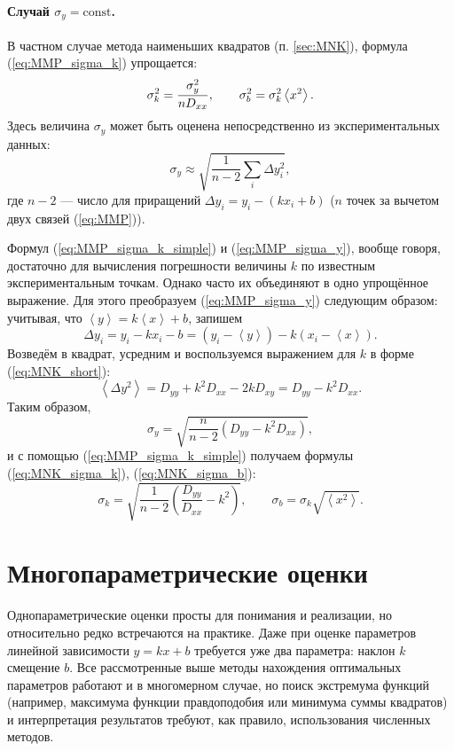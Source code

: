 \paragraph{Случай $\sigma_{y}=\mathrm{const}$.}
В частном случае метода наименьших квадратов (п. \ref{sec:MNK}),
формула (\ref{eq:MMP_sigma_k}) упрощается:
\begin{equation}
\sigma_{k}^{2}=\frac{\sigma_{y}^{2}}{nD_{xx}},\qquad\sigma_{b}^{2}=\sigma_{k}^{2}
\left<x^{2}\right>.\label{eq:MMP_sigma_k_simple}
\end{equation}
Здесь величина $\sigma_{y}$ может быть оценена непосредственно из
экспериментальных данных:
\begin{equation}
\sigma_{y}\approx\sqrt{\frac{1}{n-2}\sum_{i}\Delta y_{i}^{2}},\label{eq:MMP_sigma_y}
\end{equation}
где $n-2$ --- число 
для приращений $\Delta y_{i} = y_i - (kx_i+b)$ ($n$ точек за вычетом двух связей
(\ref{eq:MMP})).

Формул (\ref{eq:MMP_sigma_k_simple}) и (\ref{eq:MMP_sigma_y}),
вообще говоря, достаточно для вычисления погрешности величины $k$
по известным экспериментальным точкам. Однако часто их объединяют
в одно упрощённое выражение. Для этого преобразуем (\ref{eq:MMP_sigma_y})
следующим образом: учитывая, что $\left\langle y\right\rangle =k\left\langle x\right\rangle +b$,
запишем
\[
\Delta y_{i}=y_{i}-kx_{i}-b=\left(y_{i}-\left\langle y\right\rangle \right)-k\left(x_{i}-\left\langle x\right\rangle \right).
\]
Возведём в квадрат, усредним и воспользуемся выражением для $k$ в
форме (\ref{eq:MNK_short}):
\[
\left\langle \Delta y^{2}\right\rangle =D_{yy}+k^{2}D_{xx}-2kD_{xy}=D_{yy}-k^{2}D_{xx}.
\]
Таким образом,
\[
\sigma_{y}=\sqrt{\frac{n}{n-2}\left(D_{yy}-k^{2}D_{xx}\right)},
\]
и с помощью (\ref{eq:MMP_sigma_k_simple}) получаем формулы (\ref{eq:MNK_sigma_k}),
(\ref{eq:MNK_sigma_b}):
\[
\boxed{\sigma_{k}=\sqrt{\frac{1}{n-2}\left(\frac{D_{yy}}{D_{xx}}-k^{2}\right)},\qquad\sigma_{b}=\sigma_{k}\sqrt{\left\langle x^{2}\right\rangle }}.
\]

\section{Многопараметрические оценки}\label{sec:multiparam}

Однопараметрические оценки просты для понимания и реализации, но относительно
редко встречаются на практике. Даже при оценке параметров линейной зависимости
$y = k x + b$ требуется уже два параметра: наклон $k$ смещение $b$.
Все рассмотренные выше методы нахождения оптимальных параметров работают и
в многомерном случае, но поиск экстремума функций
(например, максимума функции правдоподобия или минимума суммы квадратов)
и интерпретация результатов требуют, как правило, использования численных методов.

